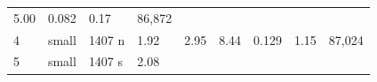 \documentclass[
  10pt, ]{article}
\begin{document}
\begin{longtable}[]{@{}lllllllll@{}}
\begin{minipage}[t]{0.08\columnwidth}
5.00\strut
\end{minipage} & \begin{minipage}[t]{0.08\columnwidth}\raggedright
0.082\strut
\end{minipage} & \begin{minipage}[t]{0.08\columnwidth}\raggedright
0.17\strut
\end{minipage} & \begin{minipage}[t]{0.08\columnwidth}\raggedright
86,872\strut
\end{minipage}\tabularnewline
\begin{minipage}[t]{0.08\columnwidth}\raggedright
4\strut
\end{minipage} & \begin{minipage}[t]{0.08\columnwidth}\raggedright
small\strut
\end{minipage} & \begin{minipage}[t]{0.08\columnwidth}\raggedright
1407 n\strut
\end{minipage} & \begin{minipage}[t]{0.08\columnwidth}\raggedright
1.92\strut
\end{minipage} & \begin{minipage}[t]{0.08\columnwidth}\raggedright
2.95\strut
\end{minipage} & \begin{minipage}[t]{0.08\columnwidth}\raggedright
8.44\strut
\end{minipage} & \begin{minipage}[t]{0.08\columnwidth}\raggedright
0.129\strut
\end{minipage} & \begin{minipage}[t]{0.08\columnwidth}\raggedright
1.15\strut
\end{minipage} & \begin{minipage}[t]{0.08\columnwidth}\raggedright
87,024\strut
\end{minipage}\tabularnewline
\begin{minipage}[t]{0.08\columnwidth}\raggedright
5\strut
\end{minipage} & \begin{minipage}[t]{0.08\columnwidth}\raggedright
small\strut
\end{minipage} & \begin{minipage}[t]{0.08\columnwidth}\raggedright
1407 s\strut
\end{minipage} & \begin{minipage}[t]{0.08\columnwidth}\raggedright
2.08\strut
\end{minipage} & \begin{minipage}[t]{0.08\columnwidth}\raggedright

\end{minipage}
\end{longtable}
\end{document}
